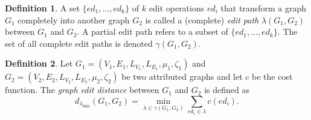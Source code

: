 \documentclass{article}
\theoremstyle{definition}
\newtheorem{definition}{Definition}
\begin{document}
\begin{definition}
  A set $\{ ed_1, \dots, ed_k \}$ of $k$ edit operations $ed_i$ that transform a graph $G_1$ completely into another graph $G_2$ is called a (complete) \emph{edit path} $\lambda(G_1, G_2)$ between $G_1$ and $G_2$. A partial edit path refers to a subset of $\{ ed_1, \dots, ed_k \}$. The set of all complete edit paths is denoted $\gamma(G_1, G_2)$.
\end{definition}
\begin{definition}
  Let $G_1 = (V_1, E_1, L_{V_1}, L_{E_1}, \mu_1, \zeta_1)$ and $G_2 = (V_2, E_2, L_{V_2}, L_{E_2}, \mu_2, \zeta_2)$ be two attributed graphs and let $c$ be the cost function. The \emph{graph edit distance} between $G_1$ and $G_2$ is defined as
  \[ d_{\lambda_{\text{min}}}(G_1, G_2) = \min_{\lambda \in \gamma(G_1, G_2)} \sum_{ed_i \in \lambda} c(ed_i).\]
\end{definition}
\end{document}
